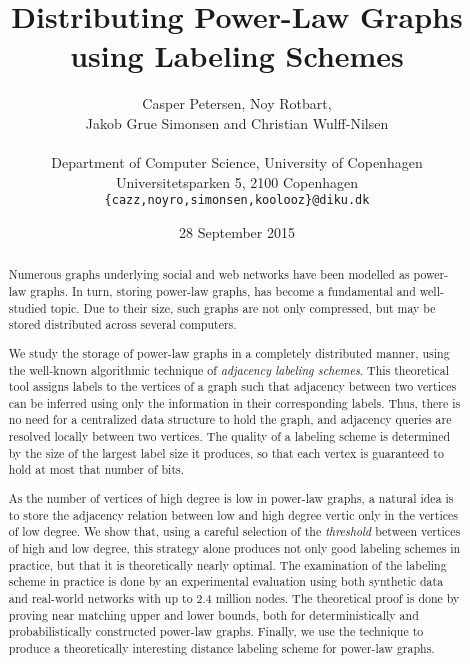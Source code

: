 \documentclass{acm_proc_article-sp}
\begin{document}
\title{Distributing Power-Law Graphs using Labeling Schemes}

\author{Casper Petersen, Noy Rotbart,\\ Jakob Grue Simonsen and Christian Wulff-Nilsen \\ \\
\small{Department of Computer Science, University of Copenhagen} \\
\small{Universitetsparken 5, 2100 Copenhagen}\\
 \small{\texttt{\{cazz,noyro,simonsen,koolooz\}@diku.dk}}  }
 

\date{28 September 2015}
\maketitle
\begin{abstract}
Numerous graphs underlying social and web networks  have been modelled as power-law graphs.
In turn, storing power-law graphs, has become  a fundamental and  well-studied topic.
Due to their size, such graphs are not only compressed, but may be stored distributed across several computers.

We study the storage of  power-law graphs in a completely distributed manner, using the well-known algorithmic technique of \emph{adjacency labeling schemes}.
This theoretical tool assigns  labels to the vertices of a graph such that   adjacency between two vertices can be inferred using only the information in their corresponding labels. Thus, there is no need for a centralized data structure to hold the graph, and adjacency queries are resolved locally between two vertices. The quality of a labeling scheme is determined by the size of the largest label size it produces, so that each vertex is guaranteed to hold at most that number of bits.

As the number of vertices of high degree is low in power-law graphs, a natural idea is to store the adjacency relation between low and high degree vertic only in the vertices of  low degree. 
We show that, using  a careful selection of the \emph{threshold} between vertices of high and low degree, this strategy alone produces not only good labeling schemes in practice, but that it is theoretically nearly optimal. 
The examination of the labeling scheme in practice is done by an experimental evaluation using both synthetic data and real-world networks with up to 2.4 million nodes.
The theoretical proof is done by proving near matching upper and lower bounds, both for deterministically and probabilistically  constructed power-law graphs.
Finally, we use the  technique  to produce a  theoretically interesting distance labeling scheme for power-law graphs.
\end{abstract}











\newpage

  
\balancecolumns
\end{document}
